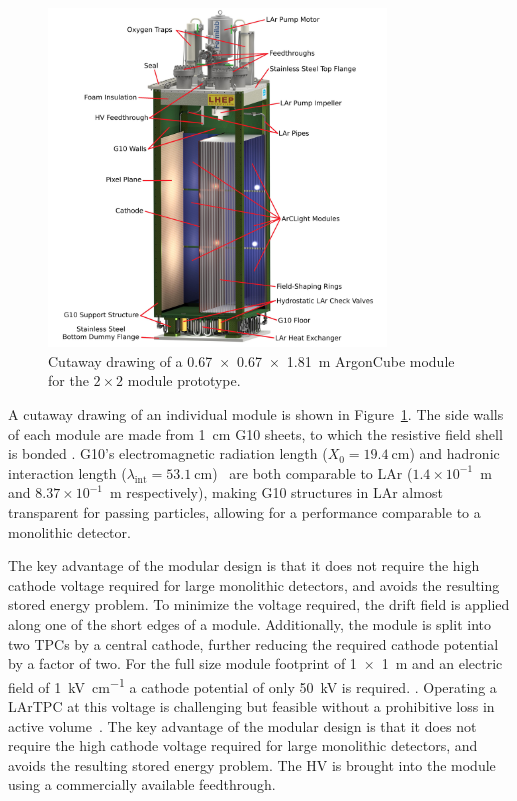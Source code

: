 \begin{figure}[tbp]
  \centering
  \includegraphics[width=0.8\textwidth]{plots/Normal-Module-4K_labelled}
  \caption[ArgonCube module engineering drawing]{Cutaway drawing of a \SI{0.67 x 0.67 x 1.81}{\metre} ArgonCube module for the $2\times2$ module prototype. }
  \label{fig:ac_module}
\end{figure}
A cutaway drawing of an individual module is shown in Figure~\ref{fig:ac_module}. The side walls of each module are made from \SI{1}{\centi\metre} G10 sheets, to which the resistive field shell is bonded . G10's electromagnetic radiation length ($X_{\mathrm{0}} = \SI{19.4}{\centi\metre}$) and hadronic interaction length ($\lambda_{\mathrm{int}} = \SI{53.1}{\centi\metre}$)~\cite{pdg_g10} are both comparable to LAr ($1.4\times10^{-1}$~m and $8.37\times10^{-1}$~m respectively), making G10 structures in LAr almost transparent for passing particles, allowing for a performance comparable to a monolithic detector.

The key advantage of the modular design is that it does not require the high cathode voltage required for large monolithic detectors, and avoids the resulting stored energy problem. To minimize the voltage required, the drift field is applied along one of the short edges of a module.  Additionally, the module is split into two TPCs by a central cathode, further reducing the required cathode potential by a factor of two. For the full size module footprint of \SI{1 x 1}{\metre} and an electric field of \SI{1}{\kilo\volt\per\centi\metre} a cathode potential of only \SI{50}{\kilo\volt} is required. . Operating a LArTPC at this voltage is challenging but feasible without a prohibitive loss in active volume~\cite{argontube}. The key advantage of the modular design is that it does not require the high cathode voltage required for large monolithic detectors, and avoids the resulting stored energy problem. The HV is brought into the module using a commercially available feedthrough.

